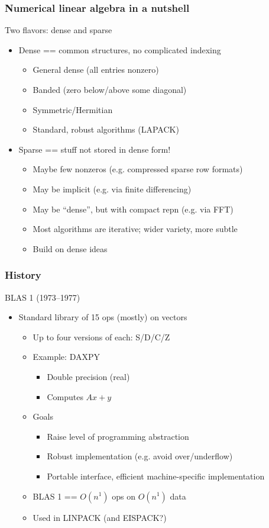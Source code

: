 \documentclass{beamer}
\begin{document}
\begin{frame}
  \frametitle{Numerical linear algebra in a nutshell}

  Two flavors: dense and sparse
  \begin{itemize}
  \item Dense == common structures, no complicated indexing
    \begin{itemize}
    \item General dense (all entries nonzero)
    \item Banded (zero below/above some diagonal)
    \item Symmetric/Hermitian
    \item Standard, robust algorithms (LAPACK)
    \end{itemize}
  \item Sparse == stuff not stored in dense form!
    \begin{itemize}
    \item Maybe few nonzeros (e.g. compressed sparse row formats)
    \item May be implicit (e.g. via finite differencing)
    \item May be ``dense'', but with compact repn (e.g. via FFT)
    \item Most algorithms are iterative; wider variety, more subtle
    \item Build on dense ideas
    \end{itemize}
  \end{itemize}

\end{frame}


\begin{frame}
  \frametitle{History}

  BLAS 1 (1973--1977)
  \begin{itemize}
  \item Standard library of 15 ops (mostly) on vectors
    \begin{itemize}
    \item Up to four versions of each: S/D/C/Z
    \item Example: DAXPY
      \begin{itemize}
      \item Double precision (real)
      \item Computes $Ax+y$
      \end{itemize}
    \item Goals
      \begin{itemize}
      \item Raise level of programming abstraction
      \item Robust implementation (e.g. avoid over/underflow)
      \item Portable interface, efficient machine-specific implementation
      \end{itemize}
    \item BLAS 1 == $O(n^1)$ ops on $O(n^1)$ data
    \item Used in LINPACK (and EISPACK?)
    \end{itemize}
  \end{itemize}
  
\end{frame}
\end{document}
